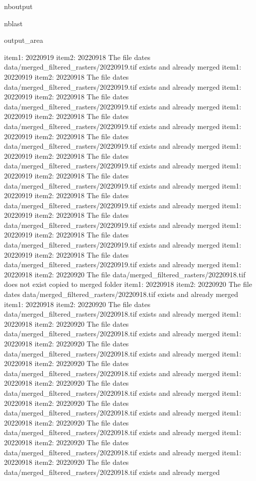 \documentclass[letterpaper,10pt]{sphinxmanual}
\begin{document}
\begin{sphinxuseclass}{nboutput}
\begin{sphinxuseclass}{nblast}
{\begin{sphinxuseclass}{output_area}
\begin{sphinxuseclass}{}
\begin{sphinxVerbatim}[commandchars=\\\{\}]
item1:  20220919
item2:  20220918
The file dates data/merged\_filtered\_rasters/20220919.tif exists and already merged
item1:  20220919
item2:  20220918
The file dates data/merged\_filtered\_rasters/20220919.tif exists and already merged
item1:  20220919
item2:  20220918
The file dates data/merged\_filtered\_rasters/20220919.tif exists and already merged
item1:  20220919
item2:  20220918
The file dates data/merged\_filtered\_rasters/20220919.tif exists and already merged
item1:  20220919
item2:  20220918
The file dates data/merged\_filtered\_rasters/20220919.tif exists and already merged
item1:  20220919
item2:  20220918
The file dates data/merged\_filtered\_rasters/20220919.tif exists and already merged
item1:  20220919
item2:  20220918
The file dates data/merged\_filtered\_rasters/20220919.tif exists and already merged
item1:  20220919
item2:  20220918
The file dates data/merged\_filtered\_rasters/20220919.tif exists and already merged
item1:  20220919
item2:  20220918
The file dates data/merged\_filtered\_rasters/20220919.tif exists and already merged
item1:  20220919
item2:  20220918
The file dates data/merged\_filtered\_rasters/20220919.tif exists and already merged
item1:  20220919
item2:  20220918
The file dates data/merged\_filtered\_rasters/20220919.tif exists and already merged
item1:  20220918
item2:  20220920
The file data/merged\_filtered\_rasters/20220918.tif does not exist copied to merged folder
item1:  20220918
item2:  20220920
The file dates data/merged\_filtered\_rasters/20220918.tif exists and already merged
item1:  20220918
item2:  20220920
The file dates data/merged\_filtered\_rasters/20220918.tif exists and already merged
item1:  20220918
item2:  20220920
The file dates data/merged\_filtered\_rasters/20220918.tif exists and already merged
item1:  20220918
item2:  20220920
The file dates data/merged\_filtered\_rasters/20220918.tif exists and already merged
item1:  20220918
item2:  20220920
The file dates data/merged\_filtered\_rasters/20220918.tif exists and already merged
item1:  20220918
item2:  20220920
The file dates data/merged\_filtered\_rasters/20220918.tif exists and already merged
item1:  20220918
item2:  20220920
The file dates data/merged\_filtered\_rasters/20220918.tif exists and already merged
item1:  20220918
item2:  20220920
The file dates data/merged\_filtered\_rasters/20220918.tif exists and already merged
item1:  20220918
item2:  20220920
The file dates data/merged\_filtered\_rasters/20220918.tif exists and already merged
item1:  20220918
item2:  20220920
The file dates data/merged\_filtered\_rasters/20220918.tif exists and already merged

\end{sphinxVerbatim}
\end{sphinxuseclass}
\end{sphinxuseclass}}
\end{sphinxuseclass}
\end{sphinxuseclass}
\end{document}
